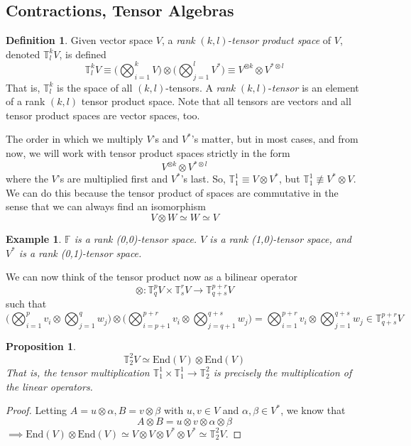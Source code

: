 \documentclass{article}
\newtheorem{proposition}[theorem]{Proposition}
\newtheorem{example}{Example}[section]
\theoremstyle{remark}
\theoremstyle{definition}
\newtheorem{definition}{Definition}[section]
\begin{document}
\subsection{Contractions, Tensor Algebras}
\begin{definition}
Given vector space $V$, a \textit{rank }$(k, l)$-\textit{tensor product space} of $V$, denoted $\mathbb{T}^{k}_{l} V$, is defined
\[ \mathbb{T}^k_l V \equiv \bigg( \bigotimes_{i=1}^{k} V \bigg) \otimes \bigg( \bigotimes_{j=1}^{l} V^{*} \bigg) \equiv V^{\otimes k} \otimes V^{* \otimes l}\]
That is, $\mathbb{T}^{k}_{l}$ is the space of all $(k, l)$-tensors. A \textit{rank }$(k, l)$-\textit{tensor} is an element of a rank $(k, l)$ tensor product space. Note that all tensors are vectors and all tensor product spaces are vector spaces, too. 

The order in which we multiply $V$'s and $V^*$'s matter, but in most cases, and from now, we will work with tensor product spaces strictly in the form 
\[ V^{\otimes k} \otimes V^{* \otimes l} \]
where the $V$'s are multiplied first and $V^*$'s last. So, $\mathbb{T}^{1}_{1} \equiv V \otimes V^*$, but $\mathbb{T}^{1}_{1} \not\equiv V^* \otimes V$. We can do this because the tensor product of spaces are commutative in the sense that we can always find an isomorphism
\[V \otimes W \simeq W \simeq V\]
\end{definition}

\begin{example}
$\mathbb{F}$ is a rank (0,0)-tensor space. $V$ is a rank (1,0)-tensor space, and $V^{*}$ is a rank (0,1)-tensor space. 
\end{example}

We can now think of the tensor product now as a bilinear operator
\[\otimes: \mathbb{T}^p_q V \times \mathbb{T}^r_s V \longrightarrow \mathbb{T}^{p+r}_{q+s} V\]
such that
\[\bigg( \bigotimes_{i=1}^p v_i \otimes \bigotimes_{j=1}^q w_j \bigg) \otimes \bigg( \bigotimes_{i = p+1}^{p+r} v_i \otimes \bigotimes_{j=q+1}^{q+s} w_j \bigg) = \bigotimes_{i=1}^{p+r} v_i \otimes \bigotimes_{j=1}^{q+s} w_j \in \mathbb{T}^{p+r}_{q+s} V\]

\begin{proposition}
\[\mathbb{T}^2_2 V \simeq \text{End}(V) \otimes \text{End}(V)\]
That is, the tensor multiplication $\mathbb{T}^1_1 \times \mathbb{T}^1_1 \longrightarrow \mathbb{T}^2_2$ is precisely the multiplication of the linear operators. 
\end{proposition}
\begin{proof}
Letting $A = u \otimes \alpha, B = v \otimes \beta$ with $u, v \in V$ and $\alpha, \beta \in V^*$, we know that
\[A \otimes B = u \otimes v \otimes \alpha \otimes \beta\]
$\implies \text{End}(V) \otimes \text{End}(V) \simeq V \otimes V \otimes V^* \otimes V^* \simeq \mathbb{T}^2_2 V$. 
\end{proof}
\end{document}
